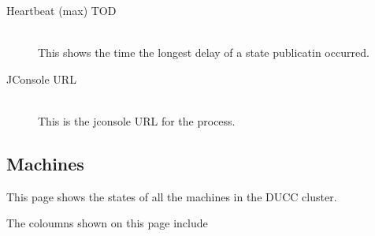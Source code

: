 \begin{description}
      \item[Heartbeat (max) TOD] \hfill \\ 
        This shows the time the longest delay of a state publicatin occurred.

      \item[JConsole URL] \hfill \\ 
        This is the jconsole URL for the process.

   \end{description}
      
\subsection{Machines}

This page shows the states of all the machines in the DUCC cluster.

The coloumns shown on this page include

